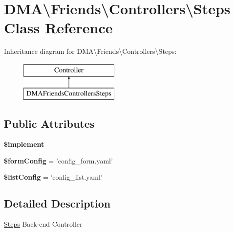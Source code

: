 \hypertarget{classDMA_1_1Friends_1_1Controllers_1_1Steps}{\section{D\-M\-A\textbackslash{}Friends\textbackslash{}Controllers\textbackslash{}Steps Class Reference}
\label{classDMA_1_1Friends_1_1Controllers_1_1Steps}
}
Inheritance diagram for D\-M\-A\textbackslash{}Friends\textbackslash{}Controllers\textbackslash{}Steps\-:\begin{figure}[H]
\begin{center}
\leavevmode
\includegraphics[height=2.000000cm]{d0/d0f/classDMA_1_1Friends_1_1Controllers_1_1Steps}
\end{center}
\end{figure}
\subsection*{Public Attributes}
\begin{DoxyCompactItemize}
\item 
{\bfseries \$implement}
\item 
\hypertarget{classDMA_1_1Friends_1_1Controllers_1_1Steps_acff6d45609493bcf45f46cbef4278190}{{\bfseries \$form\-Config} = 'config\-\_\-form.\-yaml'}\label{classDMA_1_1Friends_1_1Controllers_1_1Steps_acff6d45609493bcf45f46cbef4278190}

\item 
\hypertarget{classDMA_1_1Friends_1_1Controllers_1_1Steps_a1ff81739bf6107eccb4b3885aa6f7008}{{\bfseries \$list\-Config} = 'config\-\_\-list.\-yaml'}\label{classDMA_1_1Friends_1_1Controllers_1_1Steps_a1ff81739bf6107eccb4b3885aa6f7008}

\end{DoxyCompactItemize}


\subsection{Detailed Description}
\hyperlink{classDMA_1_1Friends_1_1Controllers_1_1Steps}{Steps} Back-\/end Controller 

